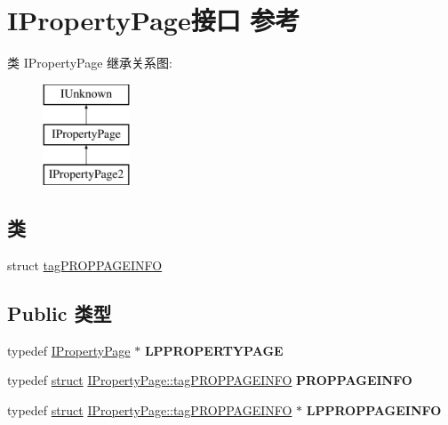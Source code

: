 \hypertarget{interface_i_property_page}{}\section{I\+Property\+Page接口 参考}
\label{interface_i_property_page}
类 I\+Property\+Page 继承关系图\+:\begin{figure}[H]
\begin{center}
\leavevmode
\includegraphics[height=3.000000cm]{interface_i_property_page}
\end{center}
\end{figure}
\subsection*{类}
\begin{DoxyCompactItemize}
\item 
struct \hyperlink{struct_i_property_page_1_1tag_p_r_o_p_p_a_g_e_i_n_f_o}{tag\+P\+R\+O\+P\+P\+A\+G\+E\+I\+N\+FO}
\end{DoxyCompactItemize}
\subsection*{Public 类型}
\begin{DoxyCompactItemize}
\item 
\mbox{\label{interface_i_property_page_a10f6d0a530bb5309d156a5101ab58ff0}} 
typedef \hyperlink{interface_i_property_page}{I\+Property\+Page} $\ast$ {\bfseries L\+P\+P\+R\+O\+P\+E\+R\+T\+Y\+P\+A\+GE}
\item 
\mbox{\label{interface_i_property_page_a0683877ca8cb24114ea7fb9fc08f6e58}} 
typedef \hyperlink{interfacestruct}{struct} \hyperlink{struct_i_property_page_1_1tag_p_r_o_p_p_a_g_e_i_n_f_o}{I\+Property\+Page\+::tag\+P\+R\+O\+P\+P\+A\+G\+E\+I\+N\+FO} {\bfseries P\+R\+O\+P\+P\+A\+G\+E\+I\+N\+FO}
\item 
\mbox{\label{interface_i_property_page_a978119418b6699aa335247a675569bb6}} 
typedef \hyperlink{interfacestruct}{struct} \hyperlink{struct_i_property_page_1_1tag_p_r_o_p_p_a_g_e_i_n_f_o}{I\+Property\+Page\+::tag\+P\+R\+O\+P\+P\+A\+G\+E\+I\+N\+FO} $\ast$ {\bfseries L\+P\+P\+R\+O\+P\+P\+A\+G\+E\+I\+N\+FO}
\end{DoxyCompactItemize}
